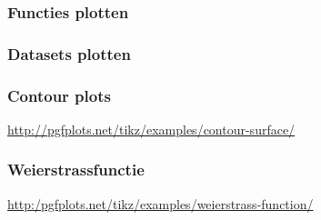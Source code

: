 \begin{frame}
  \frametitle{Functies plotten}
\end{frame}

\begin{frame}
  \frametitle{Datasets plotten}
\end{frame}

\begin{frame}
  \frametitle{Contour plots}

  \centering
  

  \small\url{http://pgfplots.net/tikz/examples/contour-surface/}
\end{frame}

\begin{frame}
  \frametitle{Weierstrassfunctie}

  \centering
  

  \small\url{http:/pgfplots.net/tikz/examples/weierstrass-function/}
\end{frame}

